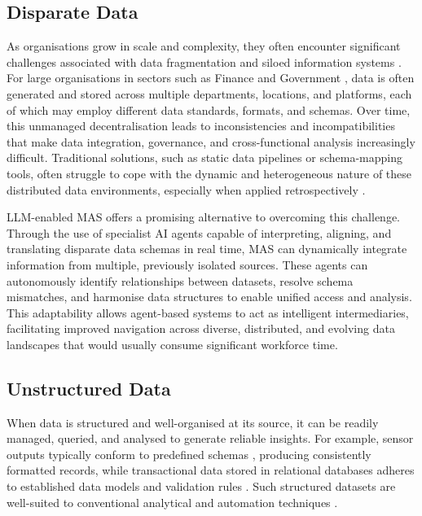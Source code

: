 \documentclass{article}
\begin{document}
\subsection{Disparate Data}

As organisations grow in scale and complexity, they often encounter significant challenges associated with data fragmentation and siloed information systems \cite{carruthers2022breaking}. For large organisations in sectors such as Finance \cite{Johnny2023datasilosgovernance} and Government \cite{Kelly2025legacygovernment}, data is often generated and stored across multiple departments, locations, and platforms, each of which may employ different data standards, formats, and schemas. Over time, this unmanaged decentralisation leads to inconsistencies and incompatibilities that make data integration, governance, and cross-functional analysis increasingly difficult. Traditional solutions, such as static data pipelines or schema-mapping tools, often struggle to cope with the dynamic and heterogeneous nature of these distributed data environments, especially when applied retrospectively \cite{bakis2007towards}.

LLM-enabled MAS offers a promising alternative to overcoming this challenge. Through the use of specialist AI agents capable of interpreting, aligning, and translating disparate data schemas in real time, MAS can dynamically integrate information from multiple, previously isolated sources. These agents can autonomously identify relationships between datasets, resolve schema mismatches, and harmonise data structures to enable unified access and analysis. This adaptability allows agent-based systems to act as intelligent intermediaries, facilitating improved navigation across diverse, distributed, and evolving data landscapes that would usually consume significant workforce time.

\subsection{Unstructured Data}

When data is structured and well-organised at its source, it can be readily managed, queried, and analysed to generate reliable insights. For example, sensor outputs typically conform to predefined schemas \cite{dunning2015time}, producing consistently formatted records, while transactional data stored in relational databases adheres to established data models and validation rules \cite{date1989guide}. Such structured datasets are well-suited to conventional analytical and automation techniques \cite{IBM2025structured}.
\end{document}
